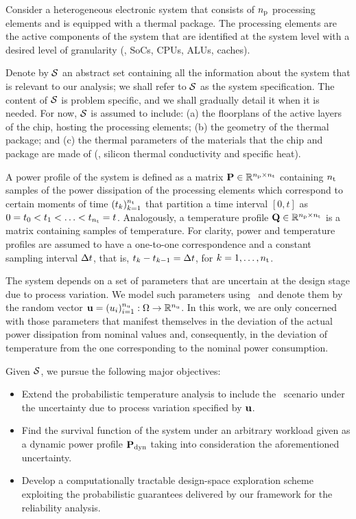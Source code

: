 Consider a heterogeneous electronic system that consists of ${n_\text{p}}$ processing elements and is equipped with a thermal package.
The processing elements are the active components of the system that are identified at the system level with a desired level of granularity (\eg, SoCs, CPUs, ALUs, caches).

Denote by $\mathcal{S}$ an abstract set containing all the information about the system that is relevant to our analysis; we shall refer to $\mathcal{S}$ as the system specification.
The content of $\mathcal{S}$ is problem specific, and we shall gradually detail it when it is needed.
For now, $\mathcal{S}$ is assumed to include: (a) the floorplans of the active layers of the chip, hosting the processing elements; (b) the geometry of the thermal package; and (c) the thermal parameters of the materials that the chip and package are made of (\eg, silicon thermal conductivity and specific heat).

A power profile of the system is defined as a matrix $\mathbf{P} \in \mathbb{R}^{{n_\text{p}} \times {n_\text{t}}}$ containing ${n_\text{t}}$ samples of the power dissipation of the processing elements which correspond to certain moments of time $(t_k)_{k = 1}^{n_\text{t}}$ that partition a time interval $[0, t]$ as $0 = t_0 < t_1 < \dotsc < t_{n_\text{t}} = t$.
Analogously, a temperature profile $\mathbf{Q} \in \mathbb{R}^{{n_\text{p}} \times {n_\text{t}}}$ is a matrix containing samples of temperature.
For clarity, power and temperature profiles are assumed to have a one-to-one correspondence and a constant sampling interval $\Delta t$, that is, $t_k - t_{k - 1} = \Delta t$, for $k = 1, \dots, {n_\text{t}}$.

The system depends on a set of parameters that are uncertain at the design stage due to process variation.
We model such parameters using \rvs\ and denote them by the random vector $\mathbf{u} = (u_i)_{i = 1}^{n_\text{u}}: \Omega \to \mathbb{R}^{n_\text{u}}$.
In this work, we are only concerned with those parameters that manifest themselves in the deviation of the actual power dissipation from nominal values and, consequently, in the deviation of temperature from the one corresponding to the nominal power consumption.

Given $\mathcal{S}$, we pursue the following major objectives:
\begin{itemize}
  \item Extend the probabilistic temperature analysis to include the \dss\ scenario under the uncertainty due to process variation specified by $\mathbf{u}$.
  \item Find the survival function of the system under an arbitrary workload given as a dynamic power profile $\mathbf{P}_{\text{dyn}}$ taking into consideration the aforementioned uncertainty.
  \item Develop a computationally tractable design-space exploration scheme exploiting the probabilistic guarantees delivered by our framework for the reliability analysis.
\end{itemize}

